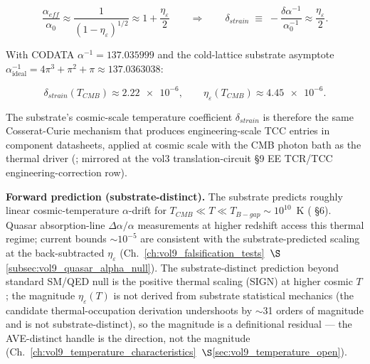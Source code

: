 \[
\frac{\alpha_{eff}}{\alpha_0} \approx \frac{1}{(1-\eta_\varepsilon)^{1/2}} \approx 1 + \frac{\eta_\varepsilon}{2}
\qquad \Rightarrow \qquad
\delta_{strain} \;\equiv\; -\frac{\delta\alpha^{-1}}{\alpha^{-1}_0} \approx \frac{\eta_\varepsilon}{2}.
\]

With CODATA $\alpha^{-1} = 137.035999$ and the cold-lattice substrate asymptote $\alpha^{-1}_{\text{ideal}} = 4\pi^3 + \pi^2 + \pi \approx 137.0363038$:

\[
\delta_{strain}(T_{CMB}) \approx \num{2.22e-6}, \qquad \eta_\varepsilon(T_{CMB}) \approx \num{4.45e-6}.
\]

The substrate's cosmic-scale temperature coefficient $\delta_{strain}$ is therefore the same Cosserat-Curie mechanism that produces engineering-scale TCC entries in component datasheets, applied at cosmic scale with the CMB photon bath as the thermal driver (; mirrored at the vol3 translation-circuit \S 9 EE TCR/TCC engineering-correction row).

\textbf{Forward prediction (substrate-distinct).} The substrate predicts roughly linear cosmic-temperature $\alpha$-drift for $T_{CMB} \ll T \ll T_{B-gap} \sim 10^{10}$~K ( \S6). Quasar absorption-line $\Delta\alpha/\alpha$ measurements at higher redshift access this thermal regime; current bounds $\sim 10^{-5}$ are consistent with the substrate-predicted scaling at the back-subtracted $\eta_\varepsilon$ (Ch.~\ref{ch:vol9_falsification_tests}~$\S$\ref{subsec:vol9_quasar_alpha_null}). The substrate-distinct prediction beyond standard SM/QED null is the positive thermal scaling (SIGN) at higher cosmic $T$; the magnitude $\eta_\varepsilon(T)$ is not derived from substrate statistical mechanics (the candidate thermal-occupation derivation undershoots by $\sim$31 orders of magnitude and is not substrate-distinct), so the magnitude is a definitional residual --- the AVE-distinct handle is the direction, not the magnitude (Ch.~\ref{ch:vol9_temperature_characteristics}~$\S$\ref{sec:vol9_temperature_open}).

